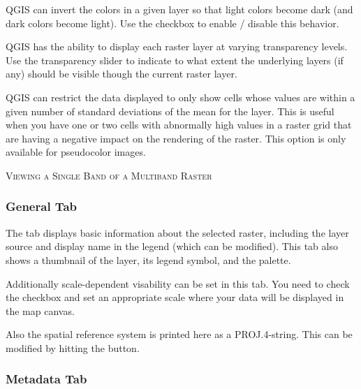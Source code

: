 \smallskip

QGIS can invert the colors in a given layer so that light colors become dark
(and dark colors become light). Use the  checkbox to
enable / disable this behavior.

QGIS has the ability to display each raster layer at varying transparency
levels. Use the transparency slider to indicate to
what extent the underlying layers (if any) should be visible though the
current raster layer. 

QGIS can restrict the data displayed to only show cells whose values are
within a given number of standard deviations of the mean for the
layer. This is useful when you have one or
two cells with abnormally high values in a raster grid that are having a
negative impact on the rendering of the raster. This option is only available
for pseudocolor images.

\begin{Tip}\caption{\textsc{Viewing a Single Band of a Multiband Raster}}
\end{Tip} 

\subsubsection{General Tab}\label{label_generaltab}

The  tab displays basic information about the selected raster,
including the layer source and  display name in the legend (which can be
modified). This tab also shows a thumbnail of the layer, its legend symbol,
and the palette.

Additionally scale-dependent visability can be set in this tab. You need to
check the checkbox and set an appropriate scale where your data will be
displayed in the map canvas.

Also the spatial reference system is printed here as a PROJ.4-string. 
This can be modified by hitting the  button.

\subsubsection{Metadata Tab}\label{label_metatab}


